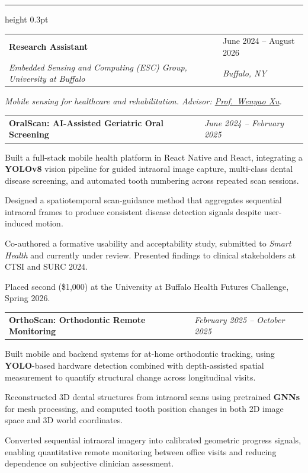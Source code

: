 \documentclass[11pt,a4paper]{article}
\makeatletter
\newcommand{\entrydivider}{%
  \vspace{4pt}%
  {\color{rulecolor}\hrule height 0.3pt}%
  \vspace{4pt}%
}
\newcommand{\roleentry}[4]{%
  \vspace{0.5em}%
  \begin{tabular*}{\textwidth}{@{\extracolsep{\fill}} ll}
    \textbf{#1} & #2 \\
    \textit{#3} & \textit{#4} \\
  \end{tabular*}%
  \vspace{0.15em}%
}
\newcommand{\subrole}[2]{%
  \vspace{0.45em}%
  \noindent\colorbox{subbg}{%
    \begin{minipage}{\dimexpr\textwidth-2\fboxsep}%
      \begin{tabular*}{\linewidth}{@{\extracolsep{\fill}} ll}
        \textbf{#1} & \textit{\small #2}%
      \end{tabular*}%
    \end{minipage}%
  }%
  \vspace{0.15em}%
}
\newcommand{\scopesentence}[1]{%
  \vspace{0.15em}%
  {\itshape #1}\par
  \vspace{0.1em}%
}
\makeatother
\begin{document}
\entrydivider

\roleentry{Research Assistant}{June 2024 -- August 2026}{Embedded Sensing and Computing (ESC) Group, University at Buffalo}{Buffalo, NY}
\scopesentence{Mobile sensing for healthcare and rehabilitation. Advisor: \href{https://cse.buffalo.edu/~wenyaoxu/index.html}{Prof.\ Wenyao Xu}.}

\subrole{OralScan: AI-Assisted Geriatric Oral Screening}{June 2024 -- February 2025}
\begin{cvlist}
  \item Built a full-stack mobile health platform in React Native and React, integrating a \textbf{YOLOv8} vision pipeline for guided intraoral image capture, multi-class dental disease screening, and automated tooth numbering across repeated scan sessions.
  \item Designed a spatiotemporal scan-guidance method that aggregates sequential intraoral frames to produce consistent disease detection signals despite user-induced motion.
  \item Co-authored a formative usability and acceptability study, submitted to \textit{Smart Health} and currently under review. Presented findings to clinical stakeholders at CTSI and SURC 2024.
  \item Placed second (\$1,000) at the University at Buffalo Health Futures Challenge, Spring 2026.
\end{cvlist}

\subrole{OrthoScan: Orthodontic Remote Monitoring}{February 2025 -- October 2025}
\begin{cvlist}
  \item Built mobile and backend systems for at-home orthodontic tracking, using \textbf{YOLO}-based hardware detection combined with depth-assisted spatial measurement to quantify structural change across longitudinal visits.
  \item Reconstructed 3D dental structures from intraoral scans using pretrained \textbf{GNNs} for mesh processing, and computed tooth position changes in both 2D image space and 3D world coordinates.
  \item Converted sequential intraoral imagery into calibrated geometric progress signals, enabling quantitative remote monitoring between office visits and reducing dependence on subjective clinician assessment.
\end{cvlist}
\end{document}
